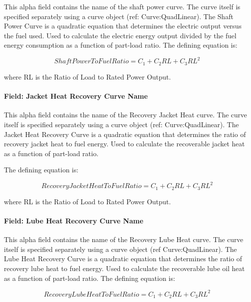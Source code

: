 This alpha field contains the name of the shaft power curve. The curve itself is specified separately using a curve object (ref: Curve:QuadLinear). The Shaft Power Curve is a quadratic equation that determines the electric output versus the fuel used. Used to calculate the electric energy output divided by the fuel energy consumption as a function of part-load ratio. The defining equation is:

\begin{equation}
ShaftPowerToFuelRatio = {C_1} + {C_2}RL + {C_3}R{L^2}
\end{equation}

where RL is the Ratio of Load to Rated Power Output.

\paragraph{Field: Jacket Heat Recovery Curve Name}\label{field-jacket-heat-recovery-curve-name}

This alpha field contains the name of the Recovery Jacket Heat curve. The curve itself is specified separately using a curve object (ref: Curve:QuadLinear). The Jacket Heat Recovery Curve is a quadratic equation that determines the ratio of recovery jacket heat to fuel energy. Used to calculate the recoverable jacket heat as a function of part-load ratio.

The defining equation is:

\begin{equation}
RecoveryJacketHeatToFuelRatio = {C_1} + {C_2}RL + {C_3}R{L^2}
\end{equation}

where RL is the Ratio of Load to Rated Power Output.

\paragraph{Field: Lube Heat Recovery Curve Name}\label{field-lube-heat-recovery-curve-name}

This alpha field contains the name of the Recovery Lube Heat curve. The curve itself is specified separately using a curve object (ref Curve:QuadLinear). The Lube Heat Recovery Curve is a quadratic equation that determines the ratio of recovery lube heat to fuel energy. Used to calculate the recoverable lube oil heat as a function of part-load ratio. The defining equation is:

\begin{equation}
RecoveryLubeHeatToFuelRatio = {C_1} + {C_2}RL + {C_3}R{L^2}
\end{equation}

